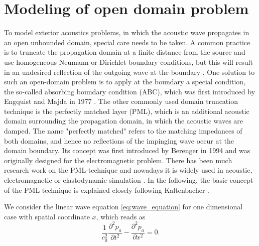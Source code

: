 \section{Modeling of open domain problem}

To model exterior acoustics problems, in which the acoustic wave propagates in an open unbounded domain, special care needs to be taken.
A common practice is to truncate the propagation domain at a finite distance from the source and use homogeneous Neumann or Dirichlet boundary conditions, but this will result in an undesired reflection of the outgoing wave at the boundary \cite{nataf_absorbing_2013, kaltenbacher_numerical_2007}. One solution to such an open-domain problem is to apply at the boundary a special condition, the so-called absorbing boundary condition (ABC), which was first introduced by Engquist and Majda in 1977 \cite{Engquist_ABC_1977}. The other commonly used domain truncation technique is the perfectly matched layer (PML), which is an additional acoustic domain surrounding the propagation domain, in which the acoustic waves are damped. The name "perfectly matched" refers to the matching impedances of both domains, and hence no reflections of the impinging wave occur at the domain boundary. Its concept was first introduced by Berenger in 1994 \cite{BERENGER_PML_1994} and was originally designed for the electromagnetic problem. There has been much research work on the PML-technique \cite{kaltenbacher_numerical_2007} and nowadays it is widely used in acoustic, electromagnetic or elastodynamic simulation \cite{nataf_absorbing_2013}. In the following, the basic concept of the PML technique is explained closely following Kaltenbacher \cite{kaltenbacher_numerical_2007, KALTENBACHER_PML_2013}.

We consider the linear wave equation \cref{eq:wave_equation} for one dimensional case with spatial coordinate $x$, which reads as 
\begin{equation}
	\frac{1}{c_0^2}\frac{\partial^2 p_a}{\partial t^2} -	\frac{\partial^2 p_a}{\partial x^2} = 0\text{.} \label{eq:1d_wave_equation}
\end{equation}

